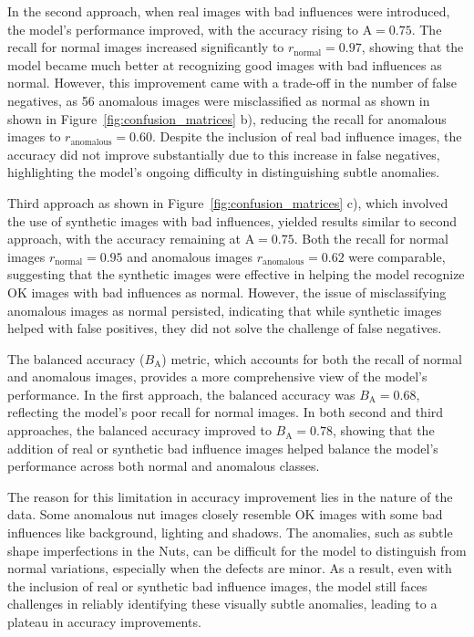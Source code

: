 \documentclass[12pt,DIV14,BCOR12mm,a4paper,footinclude=false,headinclude,parskip=half-,twoside,openright,cleardoublepage=empty,toc=index,bibliography=totoc,listof=totoc]{scrreprt}
\numberwithin{equation}{chapter}
\begin{document}
In the second approach, when real images with bad influences were introduced, the model’s performance improved, with the accuracy rising to \( \text{A} = 0.75 \). The recall for normal images increased significantly to \( r_{\text{normal}} = 0.97 \), showing that the model became much better at recognizing good images with bad influences as normal. However, this improvement came with a trade-off in the number of false negatives, as 56 anomalous images were misclassified as normal as shown in shown in Figure~\ref{fig:confusion_matrices} b), reducing the recall for anomalous images to \( r_{\text{anomalous}} = 0.60 \). Despite the inclusion of real bad influence images, the accuracy did not improve substantially due to this increase in false negatives, highlighting the model's ongoing difficulty in distinguishing subtle anomalies.

Third approach as shown in Figure~\ref{fig:confusion_matrices} c), which involved the use of synthetic images with bad influences, yielded results similar to second approach, with the accuracy remaining at \( \text{A} = 0.75 \). Both the recall for normal images \( r_{\text{normal}} = 0.95 \) and anomalous images \( r_{\text{anomalous}} = 0.62 \) were comparable, suggesting that the synthetic images were effective in helping the model recognize OK images with bad influences as normal. However, the issue of misclassifying anomalous images as normal persisted, indicating that while synthetic images helped with false positives, they did not solve the challenge of false negatives.

The balanced accuracy ($B_{\text{A}}$) metric, which accounts for both the recall of normal and anomalous images, provides a more comprehensive view of the model's performance. In the first approach, the balanced accuracy was $B_{\text{A}} = 0.68$, reflecting the model's poor recall for normal images. In both second and third approaches, the balanced accuracy improved to $B_{\text{A}} = 0.78$, showing that the addition of real or synthetic bad influence images helped balance the model's performance across both normal and anomalous classes.

The reason for this limitation in accuracy improvement lies in the nature of the data. Some anomalous nut images closely resemble OK images with some bad influences like background, lighting and shadows. The anomalies, such as subtle shape imperfections in the Nuts, can be difficult for the model to distinguish from normal variations, especially when the defects are minor. As a result, even with the inclusion of real or synthetic bad influence images, the model still faces challenges in reliably identifying these visually subtle anomalies, leading to a plateau in accuracy improvements.
\end{document}
